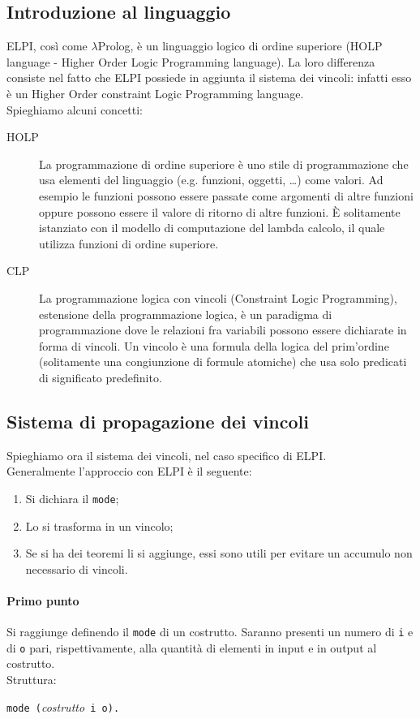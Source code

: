 \documentclass[12pt,a4paper,openright,twoside]{report}
\begin{document}
\subsection{Introduzione al linguaggio}
ELPI, così come $\lambda$Prolog, è un linguaggio logico di ordine superiore (HOLP language - Higher Order Logic Programming language). La loro differenza consiste nel fatto che ELPI possiede in aggiunta il sistema dei vincoli: infatti esso è un Higher Order constraint Logic Programming language.\\
Spieghiamo alcuni concetti:
\begin{description}
 \item[HOLP] La programmazione di ordine superiore è uno stile di programmazione che usa elementi del linguaggio (e.g. funzioni, oggetti, \ldots) come valori. Ad esempio le funzioni possono essere passate come argomenti di altre funzioni oppure possono essere il valore di ritorno di altre funzioni. È solitamente istanziato con il modello di computazione del lambda calcolo, il quale utilizza funzioni di ordine superiore.
 \item[CLP] La programmazione logica con vincoli (Constraint Logic Programming), estensione della programmazione logica, è un paradigma di programmazione dove le relazioni fra variabili possono essere dichiarate in forma di vincoli. Un vincolo è una formula della logica del prim'ordine (solitamente una congiunzione di formule atomiche) che usa solo predicati di significato predefinito.
\end{description}

\subsection{Sistema di propagazione dei vincoli}
Spieghiamo ora il sistema dei vincoli, nel caso specifico di ELPI.\\
Generalmente l'approccio con ELPI è il seguente:
\begin{enumerate}
 \item Si dichiara il \verb"mode";
 \item Lo si trasforma in un vincolo;
 \item Se si ha dei teoremi li si aggiunge, essi sono utili per evitare un accumulo non necessario di vincoli.
\end{enumerate}

\paragraph{Primo punto}
Si raggiunge definendo il \verb"mode" di un costrutto. Saranno presenti un numero di \verb"i" e di \verb"o" pari, rispettivamente, alla quantità di elementi in input e in output al costrutto.\\
Struttura:
\begin{center}
\verb"mode ("\textit{costrutto}\verb" i o)."
\end{center}
\end{document}
